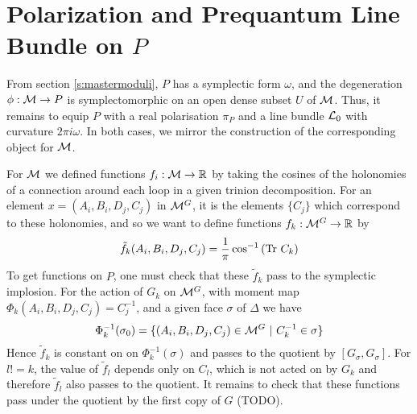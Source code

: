 \section{Polarization and Prequantum Line Bundle on $P$}
	From section \ref{s:mastermoduli}, $P$ has a symplectic form $\omega$, and the degeneration $\phi:\mathcal{M}\to P$ is symplectomorphic on an open dense subset $U$ of $\mathcal{M}$. Thus, it remains to equip $P$ with a real polarisation $\pi_P$ and a line bundle $\mathcal{L}_0$ with curvature $2\pi i \omega$. In both cases, we mirror the construction of the corresponding object for $\mathcal{M}$.
	
	For $\mathcal{M}$ we defined functions $f_i:\mathcal{M}\to \mathbb{R}$ by taking the cosines of the holonomies of a connection around each loop in a given trinion decomposition. For an element $x=(A_i,B_i,D_j,C_j)$ in $\mathcal{M}^G$, it is the elements $\{C_j\}$ which correspond to these holonomies, and so we want to define functions $f_k:\mathcal{M}^G \to \mathbb{R}$ by 
	\begin{equation}
		\tilde{f}_k(A_i,B_i,D_j,C_j) = \frac{1}{\pi}\cos^{-1} \left(\text{Tr } C_k\right)
	\end{equation}
	To get functions on $P$, one must check that these $\tilde{f}_k$ pass to the symplectic implosion. For the action of $G_k$ on $\mathcal{M}^G$, with moment map $\Phi_k(A_i,B_i,D_j,C_j) = C_j^{-1}$, and a given face $\sigma$ of $\Delta$ we have
	\begin{equation}
		\Phi_k^{-1}(\sigma_0) = \{
		(A_i,B_i,D_j,C_j) \in \mathcal{M}^G ~|~ C_k^{-1} \in \sigma
		\}
	\end{equation}
	Hence $\tilde{f}_k$ is constant on on $\Phi_k^{-1}(\sigma)$ and passes to the quotient by $[G_\sigma,G_\sigma]$. For $l != k$, the value of $\tilde{f}_l$ depends only on $C_l$, which is not acted on by $G_k$ and therefore $\tilde{f}_l$ also passes to the quotient. It remains to check that these functions pass under the quotient by the first copy of $G$ (TODO).
	
